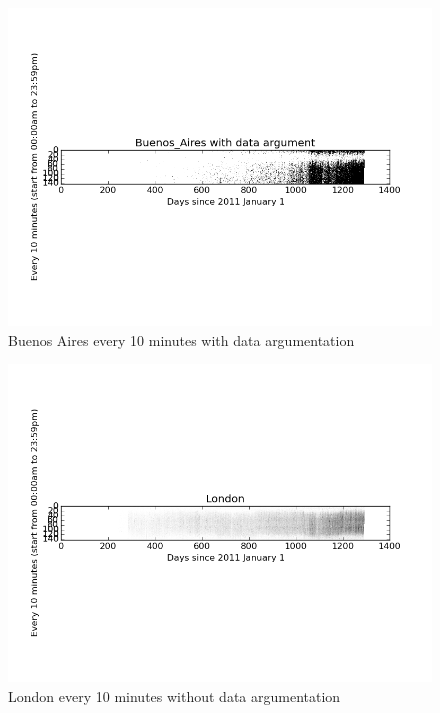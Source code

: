 \documentclass[a4paper,12pt]{article}
\begin{document}
\begin{figure}[H]
  \begin{center}
      \includegraphics[scale=0.8]{1Buenos_Airesbinary.png}
\end{center}
\caption{Buenos Aires every 10 minutes with data argumentation}
 \label {fig:2}
 \end{figure}










\begin{figure}[H]
  \begin{center}
      \includegraphics[scale=0.8]{1London.png}
\end{center}
\caption{London every 10 minutes without data argumentation}
 \label {fig:2}
 \end{figure}
\end{document}
